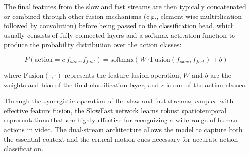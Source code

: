 The final features from the slow and fast streams are then typically concatenated or combined through other fusion mechanisms (e.g., element-wise multiplication followed by convolution) before being passed to the classification head, which usually consists of fully connected layers and a softmax activation function to produce the probability distribution over the action classes:

$$
P(\text{action} = c | f_{slow}, f_{fast}) = \text{softmax}(W \cdot \text{Fusion}(f_{slow}, f_{fast}) + b)
$$

where $\text{Fusion}(\cdot, \cdot)$ represents the feature fusion operation, $W$ and $b$ are the weights and bias of the final classification layer, and $c$ is one of the action classes.

Through the synergistic operation of the slow and fast streams, coupled with effective feature fusion, the SlowFast network learns robust spatiotemporal representations that are highly effective for recognizing a wide range of human actions in video. The dual-stream architecture allows the model to capture both the essential context and the critical motion cues necessary for accurate action classification.
